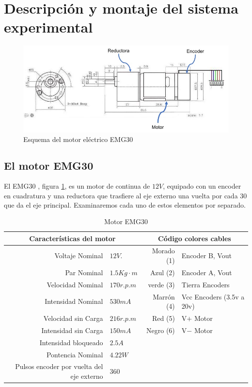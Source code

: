 \documentclass[10pt,a4paper]{report}
\begin{document}
\section{Descripción y montaje del sistema experimental}
\begin{figure}
\includegraphics[width=\textwidth]{esquema_motor.jpg}
\caption{Esquema del motor eléctrico EMG30}\label{f1}
\end{figure}
\subsection{El motor EMG30} \label{s111}
El EMG30 \cite{EMG30}, figura \ref{f1}, es un motor de continua de $12V$, equipado con un encoder en cuadratura y una reductora que trasfiere al eje  externo una vuelta por cada 30 que da el eje principal. Examinaremos cada uno de estos elementos por separado.

\begin{table}
\centering
\begin{tabular}{r l r l}
\multicolumn{2}{c}{\textbf{Características del motor}}&\multicolumn{2}{c}{\textbf{Código colores cables}}\\
\hline
Voltaje Nominal & $12 V.$ & Morado (1) & Encoder B, Vout\\
Par Nominal  & $1.5 Kg\cdot m$& Azul (2) & Encoder A, Vout\\
Velocidad Nominal &  $170r.p.m$& verde (3) & Tierra Encoders\\
Intensidad Nominal & $530 mA$& Marrón (4) & Vcc Encoders (3.5v a 20v)\\
Velocidad sin Carga & $216r.p.m$& Red (5) & V$+$ Motor\\
Intensidad sin Carga & $150mA$ & Negro (6) & V$-$ Motor\\
Intensidad bloqueado&$2.5A$\\
Pontencia Nominal &$4.22W$\\
Pulsos encoder por vuelta del eje externo & 360\\
\hline
\end{tabular}
\caption{Motor EMG30}\label{t1}
\end{table}
\end{document}
